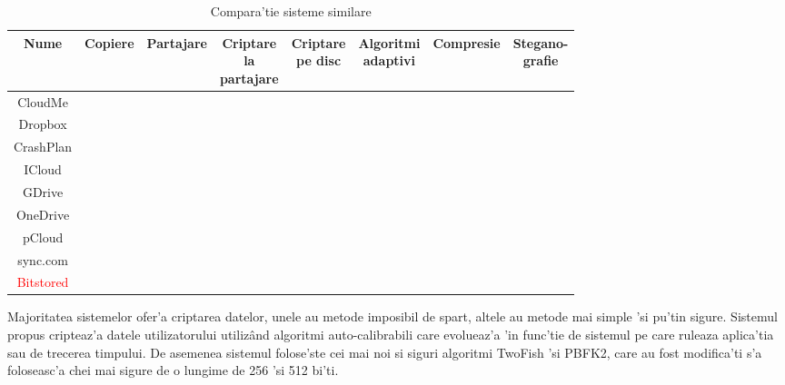 \documentclass[12pt,a4paper,twoside]{report}
\newcommand{\greencheck}{\color{green}  \ding{51}}
\newcommand{\redxmark}{\color{red} \ding{55}}
\begin{document}
\begin{table}[H]
\small
\centering
\caption{Compara'tie sisteme similare}
\begin{tabular}{|c|c|c|c|c|c|c|c|}          
\hline               
Nume & Copiere & Partajare & \makecell{Criptare\\ la \\partajare }& \makecell{Criptare\\ pe disc} & \makecell{Algoritmi \\adaptivi} & Compresie & \makecell{Stegano-\\grafie} \\ [0.5ex]   
\hline 
CloudMe & \greencheck & \greencheck & \greencheck & \redxmark & \redxmark & \redxmark & \redxmark \\    
\hline           
Dropbox & \greencheck & \greencheck & \redxmark & \greencheck & \redxmark & \greencheck & \redxmark \\               
\hline
CrashPlan & \greencheck & \redxmark & \redxmark & \greencheck & \redxmark & \redxmark & \redxmark \\   
\hline
ICloud & \greencheck & \greencheck & \redxmark & \greencheck & \redxmark & \redxmark & \redxmark \\   
\hline
GDrive & \greencheck & \greencheck & \redxmark & \greencheck & \redxmark & \greencheck & \redxmark \\   
\hline
OneDrive & \greencheck & \greencheck & \redxmark & \redxmark & \redxmark & \redxmark & \redxmark \\   
\hline
pCloud & \greencheck & \greencheck & \greencheck & \greencheck & \redxmark & \redxmark & \redxmark \\   
\hline
sync.com & \greencheck & \greencheck & \greencheck & \greencheck & \redxmark & \redxmark & \redxmark \\   
\hline
\textcolor{red} {Bitstored} & \greencheck & \greencheck & \greencheck & \greencheck & \greencheck & \greencheck & \greencheck \\               
\hline                              
\end{tabular}
\label{table:comparationtable}             
\end{table}
Majoritatea sistemelor ofer'a criptarea datelor, unele au metode imposibil de spart, altele au metode mai simple 'si pu'tin sigure. Sistemul propus cripteaz'a datele utilizatorului utilizând algoritmi auto-calibrabili  care evolueaz'a 'in func'tie de sistemul pe care ruleaza aplica'tia sau de trecerea timpului. De asemenea sistemul folose'ste cei mai noi si siguri algoritmi TwoFish 'si PBFK2, care au fost modifica'ti s'a foloseasc'a chei mai sigure de o lungime de 256 'si 512 bi'ti.
\end{document}
